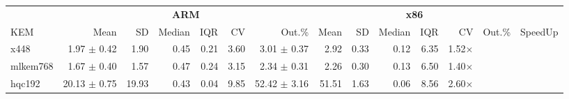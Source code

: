 \begin{table}[!ht]
\centering
\begin{tabular}{l|rrrrrr|rrrrrr|r}
\toprule
& \multicolumn{6}{c}{\bfseries ARM} & \multicolumn{6}{c}{\bfseries x86} & \\
\cmidrule(lr){2-7} \cmidrule(lr){8-13}
KEM 		& Mean & SD & Median & IQR & CV & Out.\% & Mean & SD & Median & IQR & CV & Out.\% & SpeedUp \\
\midrule
x448 		& 1.97 $\pm$  0.42 & 1.90 & 0.45 & 0.21   & 3.60 	& 3.01  $\pm$  0.37 & 2.92 & 0.33 & 0.12 & 6.35 & 1.52× \\
mlkem768 	& 1.67 $\pm$  0.40 & 1.57 & 0.47 & 0.24   & 3.15 	& 2.34  $\pm$  0.31 & 2.26 & 0.30 & 0.13 & 6.50 & 1.40× \\
hqc192 		& 20.13 $\pm$  0.75 & 19.93 & 0.43 & 0.04 & 9.85 	& 52.42 $\pm$  3.16 & 51.51 & 1.63 & 0.06 & 8.56 & 2.60× \\

\bottomrule
\end{tabular}
\end{table}
